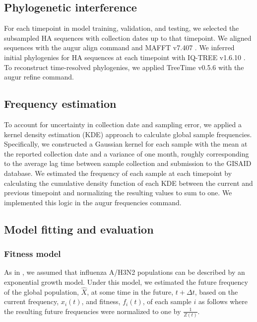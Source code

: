 \subsection*{Phylogenetic interference}

For each timepoint in model training, validation, and testing, we selected the subsampled HA sequences with collection dates up to that timepoint.
We aligned sequences with the augur align command \cite{Hadfield2018} and MAFFT v7.407 \cite{Katoh2002}.
We inferred initial phylogenies for HA sequences at each timepoint with IQ-TREE v1.6.10 \cite{Nguyen2014}.
To reconstruct time-resolved phylogenies, we applied TreeTime v0.5.6 \cite{Sagulenko2018} with the augur refine command.

\subsection*{Frequency estimation}

To account for uncertainty in collection date and sampling error, we applied a kernel density estimation (KDE) approach to calculate global sample frequencies.
Specifically, we constructed a Gaussian kernel for each sample with the mean at the reported collection date and a variance of one month, roughly corresponding to the average lag time between sample collection and submission to the GISAID database.
We estimated the frequency of each sample at each timepoint by calculating the cumulative density function of each KDE between the current and previous timepoint and normalizing the resulting values to sum to one.
We implemented this logic in the augur frequencies command.

\subsection*{Model fitting and evaluation}

\subsubsection*{Fitness model}

As in \cite{Luksza:2014hj}, we assumed that influenza A/H3N2 populations can be described by an exponential growth model.
Under this model, we estimated the future frequency of the global population, $\hat{X}$, at some time in the future, $t + \Delta{t}$, based on the current frequency, $x_{i}(t)$, and fitness, $f_{i}(t)$, of each sample $i$ as follows where the resulting future frequencies were normalized to one by $\frac{1}{Z(t)}$.

